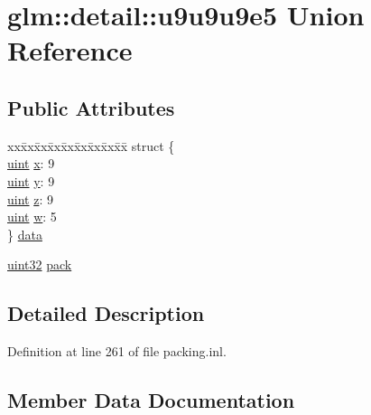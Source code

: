 \hypertarget{unionglm_1_1detail_1_1u9u9u9e5}{}\section{glm\+::detail\+::u9u9u9e5 Union Reference}
\label{unionglm_1_1detail_1_1u9u9u9e5}
\subsection*{Public Attributes}
\begin{DoxyCompactItemize}
\item 
\begin{tabbing}
xx\=xx\=xx\=xx\=xx\=xx\=xx\=xx\=xx\=\kill
struct \{\\
\>\mbox{\hyperlink{group__core__precision_ga4fd29415871152bfb5abd588334147c8}{uint}} \mbox{\hyperlink{unionglm_1_1detail_1_1u9u9u9e5_a6cca809221a0d479ce9878bfca62ad49}{x}}: 9\\
\>\mbox{\hyperlink{group__core__precision_ga4fd29415871152bfb5abd588334147c8}{uint}} \mbox{\hyperlink{unionglm_1_1detail_1_1u9u9u9e5_ae11f1138214a146e8462f2c022350254}{y}}: 9\\
\>\mbox{\hyperlink{group__core__precision_ga4fd29415871152bfb5abd588334147c8}{uint}} \mbox{\hyperlink{unionglm_1_1detail_1_1u9u9u9e5_a9eacfe6494175ce78b6e516746bb63b7}{z}}: 9\\
\>\mbox{\hyperlink{group__core__precision_ga4fd29415871152bfb5abd588334147c8}{uint}} \mbox{\hyperlink{unionglm_1_1detail_1_1u9u9u9e5_afadc52b82254e8969b5e83601309f668}{w}}: 5\\
\} \mbox{\hyperlink{unionglm_1_1detail_1_1u9u9u9e5_aec3cfb9113fe5fda39fef08bf4b46a72}{data}}\\

\end{tabbing}\item 
\mbox{\hyperlink{namespaceglm_1_1detail_ade6cfbf377022aaa391af8cd50489222}{uint32}} \mbox{\hyperlink{unionglm_1_1detail_1_1u9u9u9e5_a76c0b28299b57da27b9e023091ae9c32}{pack}}
\end{DoxyCompactItemize}


\subsection{Detailed Description}


Definition at line 261 of file packing.\+inl.



\subsection{Member Data Documentation}
\mbox{\label{unionglm_1_1detail_1_1u9u9u9e5_aec3cfb9113fe5fda39fef08bf4b46a72}} 
